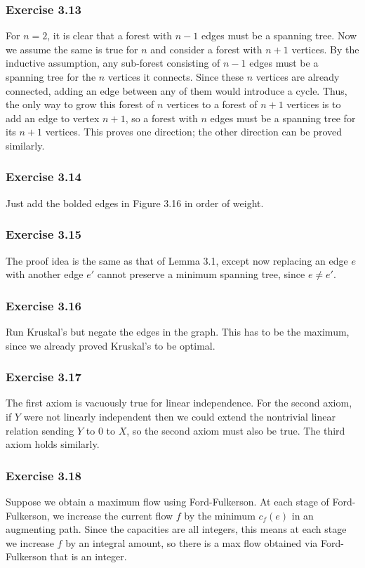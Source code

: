 \subsubsection{Exercise 3.13}
For $n = 2$, it is clear that a forest with $n-1$ edges must be a spanning tree. Now we assume the
same is true for $n$ and consider a forest with $n + 1$ vertices. By the inductive assumption, any sub-forest
consisting of $n - 1$ edges must be a spanning tree for the $n$ vertices it connects. Since these $n$ vertices
are already connected, adding an edge between any of them would introduce a cycle. Thus, the only way to grow
this forest of $n$ vertices to a forest of $n + 1$ vertices is to add an edge to vertex $n + 1$, so a forest
with  $n$ edges must be a spanning tree for its $n + 1$ vertices. This proves one direction; the other 
direction can be proved similarly.

\subsubsection{Exercise 3.14}
Just add the bolded edges in Figure 3.16 in order of weight.

\subsubsection{Exercise 3.15}
The proof idea is the same as that of Lemma 3.1, except now replacing an edge $e$ with another edge $e'$ cannot
preserve a minimum spanning tree, since $e \neq e'$.

\subsubsection{Exercise 3.16}
Run Kruskal's but negate the edges in the graph. This has to be the maximum, since we already proved Kruskal's
to be optimal.

\subsubsection{Exercise 3.17}
The first axiom is vacuously true for linear independence. For the second axiom, if $Y$ were not linearly 
independent then we could extend the nontrivial linear relation sending $Y$ to 0 to $X$, so the second axiom
must also be true. The third axiom holds similarly.

\subsubsection{Exercise 3.18}
Suppose we obtain a maximum flow using Ford-Fulkerson. At each stage of Ford-Fulkerson, we increase the current
flow $f$ by the minimum $c_f(e)$ in an augmenting path. Since the capacities are all integers, this means at 
each stage we increase $f$ by an integral amount, so there is a max flow obtained via Ford-Fulkerson that is
an integer.

